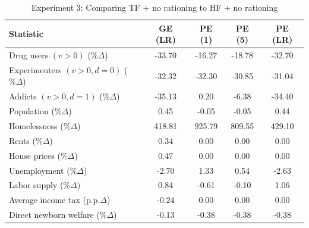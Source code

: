 \begin{table}[htbp]
\centering
\caption{Experiment 3: Comparing TF + no rationing to HF + no rationing}
\label{tab:experiment_3}
\setlength{\tabcolsep}{5pt}
\renewcommand{\arraystretch}{1.15}
\begin{tabular}{lcccc}
\toprule
Statistic 
& GE (LR)
& PE (1) 
& PE (5) 
& PE (LR) \\
\midrule
Drug users $(v>0)$ ($\%\Delta$)                    & -33.70 & -16.27 & -18.78 & -32.70 \\
Experimenters $(v>0, d=0)$ ($\%\Delta$)            & -32.32 & -32.30 & -30.85 & -31.04 \\
Addicts $(v>0, d=1)$ ($\%\Delta$)                  & -35.13 &   0.20 &  -6.38 & -34.40 \\
Population ($\%\Delta$)                            &   0.45 &  -0.05 &  -0.05 &   0.44 \\
Homelessness ($\%\Delta$)                          & 418.81 & 925.79 & 809.55 & 429.10 \\
Rents ($\%\Delta$)                                 &   0.34 &   0.00 &   0.00 &   0.00 \\
House prices ($\%\Delta$)                          &   0.47 &   0.00 &   0.00 &   0.00 \\
Unemployment ($\%\Delta$)                          &  -2.70 &   1.33 &   0.54 &  -2.63 \\
Labor supply ($\%\Delta$)                          &   0.84 &  -0.61 &  -0.10 &   1.06 \\
Average income tax (p.p.$\Delta$)                  &  -0.24 &    0.00 &  0.00 &  0.00 \\
Direct newborn welfare ($\%\Delta$)                &  -0.13 &  -0.38 &  -0.38 &  -0.38 \\
\bottomrule
\bottomrule
\end{tabular}
\end{table}
